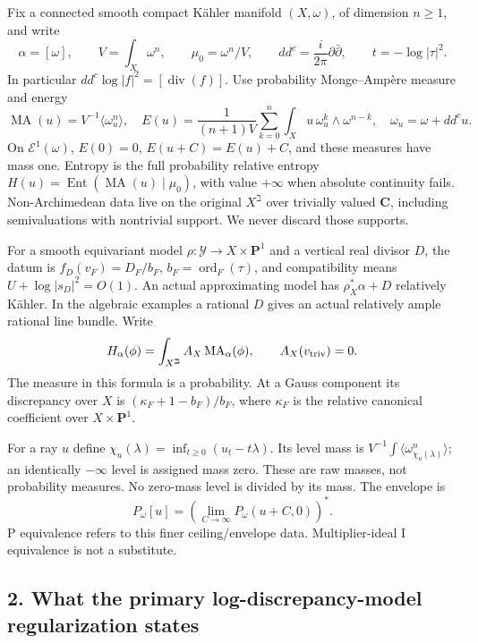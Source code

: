 \documentclass[
  11pt,
]{article}
\begin{document}
Fix a connected smooth compact Kähler manifold \((X,\omega)\), of
dimension \(n\geq1\), and write \[
 \alpha=[\omega],\qquad V=\int_X\omega^n,\qquad
 \mu_0=\omega^n/V,\qquad dd^c=\frac{i}{2\pi}\partial\bar\partial,
 \qquad t=-\log|\tau|^2.
\] In particular \(dd^c\log|f|^2=[\operatorname{div}(f)]\). Use
probability Monge--Ampère measure and energy \[
 \operatorname{MA}(u)=V^{-1}\langle\omega_u^n\rangle,
 \quad E(u)=\frac{1}{(n+1)V}\sum_{k=0}^n
              \int_Xu\,\omega_u^k\wedge\omega^{n-k},
 \quad \omega_u=\omega+dd^cu.
\] On \(\mathcal E^1(\omega)\), \(E(0)=0\), \(E(u+C)=E(u)+C\), and these
measures have mass one. Entropy is the full probability relative entropy
\(H(u)=\operatorname{Ent}(\operatorname{MA}(u)\mid\mu_0)\), with value
\(+\infty\) when absolute continuity fails. Non-Archimedean data live on
the original \(X^\beth\) over trivially valued \(\mathbf C\), including
semivaluations with nontrivial support. We never discard those supports.

For a smooth equivariant model \(\rho:\mathcal Y\to X\times\mathbf P^1\)
and a vertical real divisor \(D\), the datum is \(f_D(v_F)=D_F/b_F\),
\(b_F=\operatorname{ord}_F(\tau)\), and compatibility means
\(U+\log|s_D|^2=O(1)\). An actual approximating model has
\(\rho_X^*\alpha+D\) relatively Kähler. In the algebraic examples a
rational \(D\) gives an actual relatively ample rational line bundle.
Write \[
 H_\alpha(\phi)=\int_{X^\beth}A_X\operatorname{MA}_\alpha(\phi),
 \qquad A_X(v_{\rm triv})=0.
\] The measure in this formula is a probability. At a Gauss component
its discrepancy over \(X\) is \((\kappa_F+1-b_F)/b_F\), where
\(\kappa_F\) is the relative canonical coefficient over
\(X\times\mathbf P^1\).

For a ray \(u\) define \(\chi_u(\lambda)=\inf_{t\geq0}(u_t-t\lambda)\).
Its level mass is
\(V^{-1}\int\langle\omega_{\chi_u(\lambda)}^n\rangle\); an identically
\(-\infty\) level is assigned mass zero. These are raw masses, not
probability measures. No zero-mass level is divided by its mass. The
envelope is
\[ P_\omega[u]=\left(\lim_{C\to\infty}P_\omega(u+C,0)\right)^*.\] P
equivalence refers to this finer ceiling/envelope data. Multiplier-ideal
I equivalence is not a substitute.

\subsection{2. What the primary log-discrepancy-model regularization
states}\label{what-the-primary-log-discrepancy-model-regularization-states}
\end{document}
